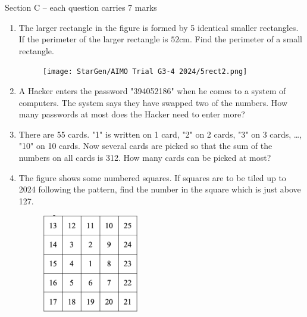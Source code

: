 \documentclass[11pt]{scrartcl}
\begin{document}
\newpage
Section C – each question carries 7 marks

\hrulefill %
\begin{enumerate}[resume]
    \item The larger rectangle in the figure is formed by 5 identical smaller rectangles. If the perimeter of the larger rectangle is $52$cm. Find the perimeter of a small rectangle. 
    \begin{figure}[h]
        \centering
        \texttt{[image: StarGen/AIMO Trial G3-4 2024/5rect2.png]}
    \end{figure}
    
    \vspace{8cm} \item A Hacker enters the password "394052186" when he comes to a system of computers. The system says they have swapped two of the numbers. How many passwords at most does the Hacker need to enter more?

    \vspace{10cm} \item There are 55 cards. "1" is written on 1 card, "2" on 2 cards, "3" on 3 cards, \ldots, "10" on 10 cards. Now several cards are picked so that the sum of the numbers on all cards is 312. How many cards can be picked at most?
    
    \vspace{8cm} \item The figure shows some numbered squares. If squares are to be tiled up to 2024 following the pattern, find the number in the square which is just above 127. 
    \begin{figure}[h]
        \centering
        \includegraphics[width=0.4\textwidth]{StarGen/AIMO Trial G3-4 2024/square-siput.png}
    \end{figure}
\end{enumerate}
\end{document}
